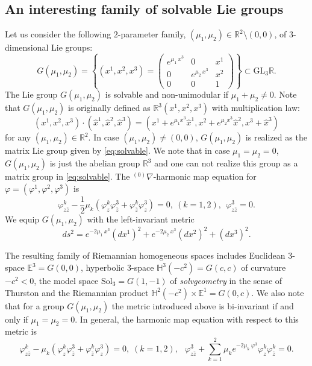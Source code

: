 \documentclass[12pt]{amsart}
\theoremstyle{definition}
\theoremstyle{remark}
\numberwithin{equation}{section}
\begin{document}
\subsection{An interesting family of solvable Lie groups}
\label{subsc:Sol3}
 Let us consider the following $2$-parameter 
 family, $(\mu_1,\mu_2) \in \mathbb{R}^2 \setminus (0,0)$, of $3$-dimensional
 Lie groups:
\begin{equation}\label{eq:solvable}
G(\mu_1,\mu_2)=\left\{
(x^1,x^2,x^3)=\left(
\begin{array}{cccc}
 e^{\mu_1\>x^3} & 0 & x^1\\
 0 & e^{\mu_2\>x^3} & x^2\\
 0 & 0 &1 
\end{array}
\right)
\right\}
\subset 
\mathrm{GL}_{3}\mathbb{R}.
\end{equation}
 The Lie group $G(\mu_1,\mu_2)$ is solvable 
 and non-unimodular if $\mu_1+\mu_2\not=0$. 
 Note that $G(\mu_1, \mu_2)$ is originally defined as 
 $\mathbb R^3 (x^1, x^2, x^3)$ with multiplication law: 
\begin{equation*}
 (x^1, x^2, x^3) \cdot (\hat x^{1}, \hat x^{2}, \hat x^{3}) =
 ( x^1 + e^{\mu_1 x^3} \hat x^{1}, x^2 + e^{\mu_2 x^3} \hat x^{2}, x^3
 + \hat x^{3})
\end{equation*}
 for any $(\mu_1, \mu_2) \in \mathbb R^2$. In case $(\mu_1, \mu_2) \neq (0, 0)$, 
 $G(\mu_1, \mu_2)$ is realized as the matrix Lie group given by \eqref{eq:solvable}.
 We note that in case $\mu_1 = \mu_2=0$, $G(\mu_1, \mu_2)$ 
 is just the abelian group $\mathbb R^3$ 
 and one can not realize this group as a matrix group in 
 \eqref{eq:solvable}.
 The ${{}^{(0)}\nabla}$-harmonic map equation for 
 $\varphi=(\varphi^1,\varphi^2,\varphi^3)$ is 
\begin{equation}\label{sol-0-harm}
\varphi^{k}_{z\bar{z}}-\frac{1}{2}\mu_{k}
(\varphi^k_z\varphi^3_{\bar z}+\varphi^k_{\bar z}\varphi^3_z)=0, \>(k=1,2),
\ \ \varphi^3_{z\bar{z}}=0.
\end{equation}
  We equip $G(\mu_1,\mu_2)$ with the left-invariant metric
\begin{equation*}
 ds^2 =e^{-2\mu_1\>x^3}(dx^1)^2+e^{-2\mu_2\>x^3}(dx^2)^2+(dx^3)^2.
\end{equation*}
 

 The resulting family of Riemannian homogeneous spaces includes
 Euclidean $3$-space $\mathbb{E}^3=G(0,0)$, hyperbolic $3$-space 
 $\mathbb{H}^3(-c^2)=G(c,c)$ of curvature 
 $-c^2<0$, the model space $\mathrm{Sol}_3=G(1,-1)$ 
 of \textit{solvgeometry}  
 in the sense of Thurston and the Riemannian product 
 $\mathbb{H}^{2}(-c^2)\times \mathbb{E}^1
 =G(0,c)$. 
 We also note that for a group $G(\mu_1,\mu_2)$  the metric introduced above is  bi-invariant if and 
 only if $\mu_1 = \mu_2 =0$.
 In general, the harmonic map equation with respect to this metric is
\begin{equation}\label{sol-harm}
\varphi^{k}_{z\bar{z}}-\mu_{k}
(\varphi^k_z\varphi^3_{\bar z}+\varphi^k_{\bar z}\varphi^3_z)=0, \;(k=1,2), \;
\ \ \varphi^3_{z\bar z}+\sum_{k=1}^{2}\mu_{k}
e^{-2\mu_k\>\varphi^3}\varphi^{k}_{z}\varphi^{k}_{\bar z}=0.
\end{equation}
\end{document}
